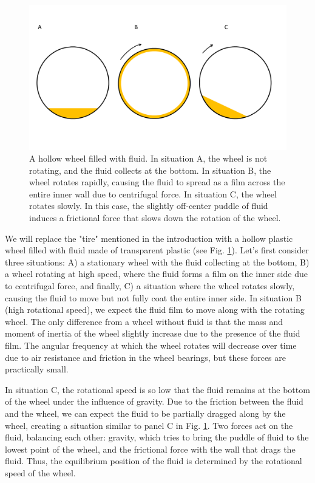 \documentclass{article}
\begin{document}
\begin{figure}[H]
    \centering
    \includegraphics[scale=0.35]{figures/wiel.png}
    \caption{A hollow wheel filled with fluid. In situation A, the wheel is not rotating, and the fluid collects at the bottom. In situation B, the wheel rotates rapidly, causing the fluid to spread as a film across the entire inner wall due to centrifugal force. In situation C, the wheel rotates slowly. In this case, the slightly off-center puddle of fluid induces a frictional force that slows down the rotation of the wheel.}
    \label{Fig. wheel}
\end{figure}

We will replace the "tire" mentioned in the introduction with a hollow plastic wheel filled with fluid made of transparent plastic (see Fig. \ref{Fig. wheel}). Let's first consider three situations: A) a stationary wheel with the fluid collecting at the bottom, B) a wheel rotating at high speed, where the fluid forms a film on the inner side due to centrifugal force, and finally, C) a situation where the wheel rotates slowly, causing the fluid to move but not fully coat the entire inner side. In situation B (high rotational speed), we expect the fluid film to move along with the rotating wheel. The only difference from a wheel without fluid is that the mass and moment of inertia of the wheel slightly increase due to the presence of the fluid film. The angular frequency at which the wheel rotates will decrease over time due to air resistance and friction in the wheel bearings, but these forces are practically small.

In situation C, the rotational speed is so low that the fluid remains at the bottom of the wheel under the influence of gravity. Due to the friction between the fluid and the wheel, we can expect the fluid to be partially dragged along by the wheel, creating a situation similar to panel C in Fig. \ref{Fig. wheel}. Two forces act on the fluid, balancing each other: gravity, which tries to bring the puddle of fluid to the lowest point of the wheel, and the frictional force with the wall that drags the fluid. Thus, the equilibrium position of the fluid is determined by the rotational speed of the wheel.
\end{document}
